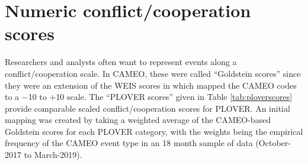 \documentclass[11pt]{report}
\newcommand{\plcat}[1]{\textsf{#1}}
\newcommand{\plmod}[1]{\texttt{#1}}
\begin{document}




\section{Numeric conflict/cooperation scores}


Researchers and analysts often want to represent events along a conflict/cooperation scale. In CAMEO, these were called ``Goldstein scores'' since they were an extension of the WEIS scores in \cite{Goldstein92} which mapped the CAMEO codes to a $-$10 to $+$10 scale. The ``PLOVER scores'' given in Table \ref{tab:ploverscores} provide comparable scaled conflict/cooperation scores for PLOVER. An initial mapping was created by taking a weighted average of the CAMEO-based Goldstein scores for each PLOVER category, with the weights being the empirical frequency of the CAMEO event type in an 18 month sample of data (October-2017 to March-2019).
\end{document}
